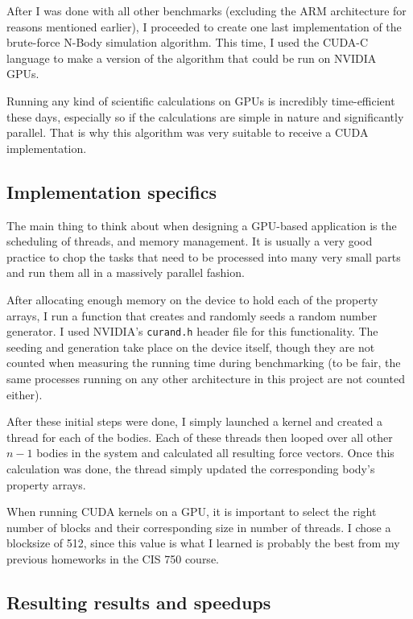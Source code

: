 \documentclass[journal]{IEEEtran}
\begin{document}
		After I was done with all other benchmarks (excluding the ARM architecture for reasons mentioned earlier), I proceeded to create one last implementation of the brute-force N-Body simulation algorithm. This time, I used the CUDA-C language to make a version of the algorithm that could be run on NVIDIA GPUs.
		
		Running any kind of scientific calculations on GPUs is incredibly time-efficient these days, especially so if the calculations are simple in nature and significantly parallel. That is why this algorithm was very suitable to receive a CUDA implementation.
		
		\subsection*{Implementation specifics}
		
			The main thing to think about when designing a GPU-based application is the scheduling of threads, and memory management. It is usually a very good practice to chop the tasks that need to be processed into many very small parts and run them all in a massively parallel fashion.
			
			After allocating enough memory on the device to hold each of the property arrays, I run a function that creates and randomly seeds a random number generator. I used NVIDIA's \texttt{curand.h} header file for this functionality. The seeding and generation take place on the device itself, though they are not counted when measuring the running time during benchmarking (to be fair, the same processes running on any other architecture in this project are not counted either).
			
			After these initial steps were done, I simply launched a kernel and created a thread for each of the bodies. Each of these threads then looped over all other $n-1$ bodies in the system and calculated all resulting force vectors. Once this calculation was done, the thread simply updated the corresponding body's property arrays.
			
			When running CUDA kernels on a GPU, it is important to select the right number of blocks and their corresponding size in number of threads. I chose a blocksize of 512, since this value is what I learned is probably the best from my previous homeworks in the CIS 750 course.
			
		\subsection*{Resulting results and speedups}
		
\end{document}
